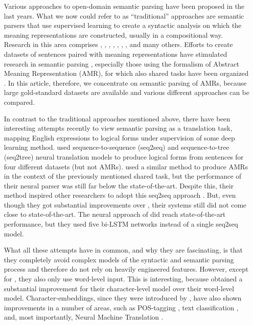 \documentclass[a4paper,10pt,twoside]{article}
\begin{document}
Various approaches to open-domain semantic parsing have been proposed in the last years. What we now could refer to as 
``traditional'' approaches are semantic parsers that use supervised learning to create a syntactic analysis on which the meaning representations are constructed, usually in a compositional way. Research in this area comprises ,
,
, 
,
,
,
, and many others.
Efforts to create datasets of sentences paired with meaning representations have stimulated research in semantic parsing \cite{amr,Bos2017GMB}, especially those using the formalism of Abstract Meaning Representation (AMR), for which also shared tasks have been organized \cite{sharedtask:16}. 
In this article, therefore, we concentrate
on semantic parsing of AMRs, because large gold-standard datasets are available and various different approaches can be compared.

In contrast to the traditional approaches mentioned above,
there have been interesting attempts recently to view semantic parsing as a translation task, mapping English expressions to logical forms under supervision of some deep learning method. 
 used sequence-to-sequence (seq2seq) and sequence-to-tree (seq2tree) neural translation models to produce logical forms from sentences for four different datasets (but not AMRs).
 used a similar method to produce AMRs in the context of the previously mentioned shared task, but the performance of their neural parser was still far below the state-of-the-art. Despite this, their method inspired other researchers to adopt this seq2seq approach \cite{peng:17,konstas:17}. But, even though they got substantial improvements over , their systems still did not come close to state-of-the-art. 
The neural approach of  did reach state-of-the-art performance, but they used five bi-LSTM networks instead of a single seq2seq model.

What all these attempts have in common, and why they are fascinating, is that they completely avoid complex models of the syntactic and semantic parsing process and therefore do not rely on heavily engineered features. However, except for , they also only use word-level input. This is interesting, because  obtained a substantial improvement for their character-level model over their word-level model. 
Character-embeddings, 
since they were introduced by , have also shown improvements in a number of areas, such as POS-tagging \cite{charpos:14,plank:16}, text classification \cite{zhang:15}, and, most importantly, Neural Machine Translation \cite{chung-cho-bengio:2016:WMT}.
\end{document}
